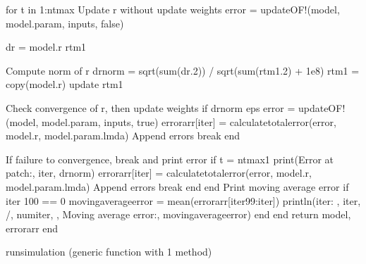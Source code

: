 \documentclass[letterpaper,10pt,english]{sphinxmanual}
\begin{document}
\begin{sphinxVerbatim}[commandchars=\\\{\}]
        for t in 1:nt\PYGZus{}max
            \PYGZsh{} Update r without update weights 
            error = updateOF!(model, model.param, inputs, false)

            dr = model.r \PYGZhy{} r\PYGZus{}tm1 

            \PYGZsh{} Compute norm of r
            dr\PYGZus{}norm = sqrt(sum(dr.\PYGZca{}2)) / sqrt(sum(r\PYGZus{}tm1.\PYGZca{}2) + 1e\PYGZhy{}8)
            r\PYGZus{}tm1 = copy(model.r) \PYGZsh{} update r\PYGZus{}tm1

            \PYGZsh{} Check convergence of r, then update weights
            if dr\PYGZus{}norm \PYGZlt{} eps
                error = updateOF!(model, model.param, inputs, true)
                errorarr[iter] = calculate\PYGZus{}total\PYGZus{}error(error, model.r, model.param.lmda) \PYGZsh{} Append errors
                break
            end

            \PYGZsh{} If failure to convergence, break and print error
            if t \PYGZgt{}= nt\PYGZus{}max\PYGZhy{}1
                print(\PYGZdq{}Error at patch:\PYGZdq{}, iter\PYGZus{}, dr\PYGZus{}norm)
                errorarr[iter] = calculate\PYGZus{}total\PYGZus{}error(error, model.r, model.param.lmda) \PYGZsh{} Append errors
                break
            end
        end
        \PYGZdq{}\PYGZdq{}\PYGZdq{}
        \PYGZsh{} Print moving average error
        if iter \PYGZpc{} 100 == 0
            moving\PYGZus{}average\PYGZus{}error = mean(errorarr[iter\PYGZhy{}99:iter])
            println(\PYGZdq{}iter: \PYGZdq{}, iter, \PYGZdq{}/\PYGZdq{}, num\PYGZus{}iter, \PYGZdq{}, Moving average error:\PYGZdq{}, moving\PYGZus{}average\PYGZus{}error)
        end
        \PYGZdq{}\PYGZdq{}\PYGZdq{}
    end
    return model, errorarr
end
\end{sphinxVerbatim}

\begin{sphinxVerbatim}[commandchars=\\\{\}]
run\PYGZus{}simulation (generic function with 1 method)
\end{sphinxVerbatim}
\end{document}
